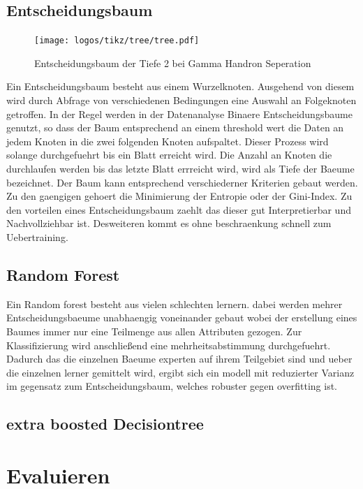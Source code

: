 \subsection{Entscheidungsbaum}
\begin{figure}
  \texttt{[image: logos/tikz/tree/tree.pdf]}
  \caption{Entscheidungsbaum der Tiefe 2 bei Gamma Handron Seperation}
\end{figure}
Ein Entscheidungsbaum besteht aus einem Wurzelknoten. Ausgehend von diesem wird durch Abfrage von verschiedenen Bedingungen eine Auswahl an Folgeknoten getroffen. In der Regel werden in der Datenanalyse Binaere Entscheidungsbaume genutzt, so dass der Baum entsprechend an einem threshold wert die Daten an jedem Knoten in die zwei folgenden Knoten aufspaltet. Dieser Prozess wird solange durchgefuehrt bis ein Blatt erreicht wird. Die Anzahl an Knoten die durchlaufen werden bis das letzte Blatt errreicht wird, wird als Tiefe der Baeume bezeichnet.
Der Baum kann entsprechend verschiederner Kriterien gebaut werden. Zu den gaengigen gehoert die Minimierung der Entropie oder der Gini-Index. 
Zu den vorteilen eines Entscheidungsbaum zaehlt das dieser gut Interpretierbar und Nachvollziehbar ist. Desweiteren kommt es ohne beschraenkung schnell zum Uebertraining.
\subsection{Random Forest}
Ein Random forest besteht aus vielen schlechten lernern. dabei werden mehrer Entscheidungsbaeume unabhaengig voneinander gebaut wobei der erstellung eines Baumes immer nur eine Teilmenge aus allen Attributen gezogen. Zur Klassifizierung wird anschließend eine mehrheitsabstimmung durchgefuehrt. Dadurch das die einzelnen Baeume experten auf ihrem Teilgebiet sind und ueber die einzelnen lerner gemittelt wird, ergibt sich ein modell mit reduzierter Varianz im gegensatz zum Entscheidungsbaum, welches robuster gegen overfitting ist.
\subsection{extra boosted Decisiontree}

\section{Evaluieren}

